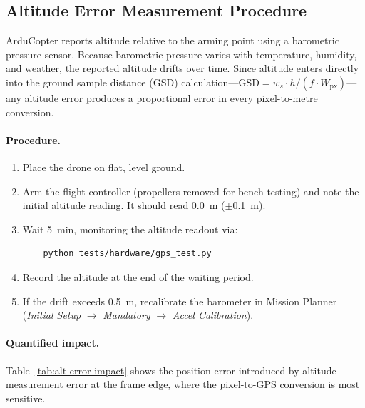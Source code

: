 \subsection{Altitude Error Measurement Procedure}\label{sec:cal:alt-error}

ArduCopter reports altitude relative to the arming point using a barometric pressure sensor. Because barometric pressure varies with temperature, humidity, and weather, the reported altitude drifts over time. Since altitude enters directly into the ground sample distance (GSD) calculation---$\text{GSD} = w_s \cdot h / (f \cdot W_{\text{px}})$---any altitude error produces a proportional error in every pixel-to-metre conversion.

\paragraph{Procedure.}
\begin{enumerate}
    \item Place the drone on flat, level ground.
    \item Arm the flight controller (propellers removed for bench testing) and note the initial altitude reading. It should read \SI{0.0}{\metre} ($\pm$\SI{0.1}{\metre}).
    \item Wait \SI{5}{\minute}, monitoring the altitude readout via:
    \begin{verbatim}
    python tests/hardware/gps_test.py
    \end{verbatim}
    \item Record the altitude at the end of the waiting period.
    \item If the drift exceeds \SI{0.5}{\metre}, recalibrate the barometer in Mission Planner (\textit{Initial Setup} $\rightarrow$ \textit{Mandatory} $\rightarrow$ \textit{Accel Calibration}).
\end{enumerate}

\paragraph{Quantified impact.} Table~\ref{tab:alt-error-impact} shows the position error introduced by altitude measurement error at the frame edge, where the pixel-to-GPS conversion is most sensitive.


